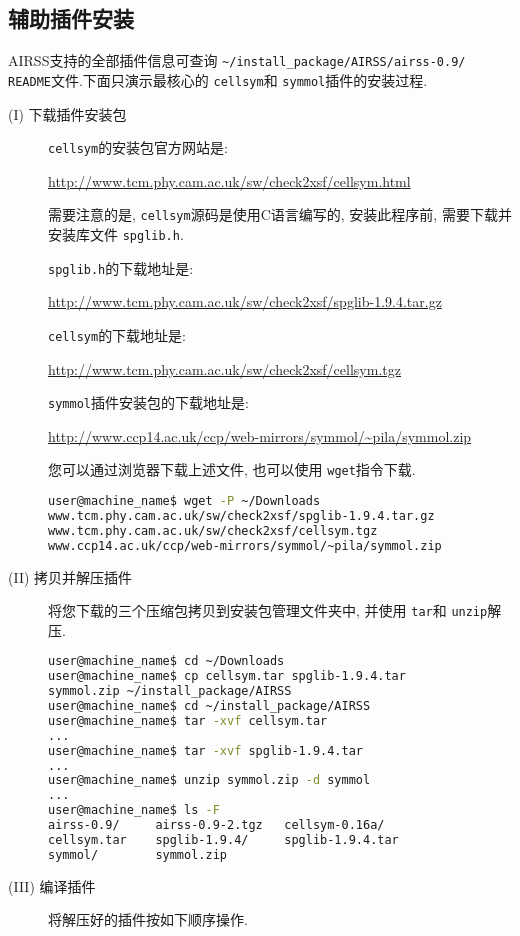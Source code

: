 \documentclass[a4paper, 10pt]{article}
\begin{document}
\subsection{辅助插件安装}
AIRSS支持的全部插件信息可查询 \verb|~/install_package/AIRSS/airss-0.9/|
 \verb|README|文件.下面只演示最核心的 \verb|cellsym|和 \verb|symmol|插件的安装过程.
\begin{description}
\item[(I) 下载插件安装包]
 \verb|cellsym|的安装包官方网站是:

\url{http://www.tcm.phy.cam.ac.uk/sw/check2xsf/cellsym.html}

需要注意的是, \verb|cellsym|源码是使用C语言编写的, 安装此程序前, 需要下载并安装库文件 \verb|spglib.h|.

 \verb|spglib.h|的下载地址是:

\url{http://www.tcm.phy.cam.ac.uk/sw/check2xsf/spglib-1.9.4.tar.gz}

 \verb|cellsym|的下载地址是:

\url{http://www.tcm.phy.cam.ac.uk/sw/check2xsf/cellsym.tgz}

 \verb|symmol|插件安装包的下载地址是:

\url{http://www.ccp14.ac.uk/ccp/web-mirrors/symmol/~pila/symmol.zip}

您可以通过浏览器下载上述文件, 也可以使用 \verb|wget|指令下载.
\begin{lstlisting}[language={bash}]
user@machine_name$ wget -P ~/Downloads 
www.tcm.phy.cam.ac.uk/sw/check2xsf/spglib-1.9.4.tar.gz 
www.tcm.phy.cam.ac.uk/sw/check2xsf/cellsym.tgz 
www.ccp14.ac.uk/ccp/web-mirrors/symmol/~pila/symmol.zip
\end{lstlisting}

\item[(II) 拷贝并解压插件]将您下载的三个压缩包拷贝到安装包管理文件夹中, 并使用 \verb|tar|和 \verb|unzip|解压.
\begin{lstlisting}[language={bash}]
user@machine_name$ cd ~/Downloads
user@machine_name$ cp cellsym.tar spglib-1.9.4.tar 
symmol.zip ~/install_package/AIRSS
user@machine_name$ cd ~/install_package/AIRSS
user@machine_name$ tar -xvf cellsym.tar
...
user@machine_name$ tar -xvf spglib-1.9.4.tar
...
user@machine_name$ unzip symmol.zip -d symmol
...
user@machine_name$ ls -F
airss-0.9/     airss-0.9-2.tgz   cellsym-0.16a/  
cellsym.tar    spglib-1.9.4/     spglib-1.9.4.tar  
symmol/        symmol.zip
\end{lstlisting}

\item[(III) 编译插件]将解压好的插件按如下顺序操作.


\end{description}
\end{document}
